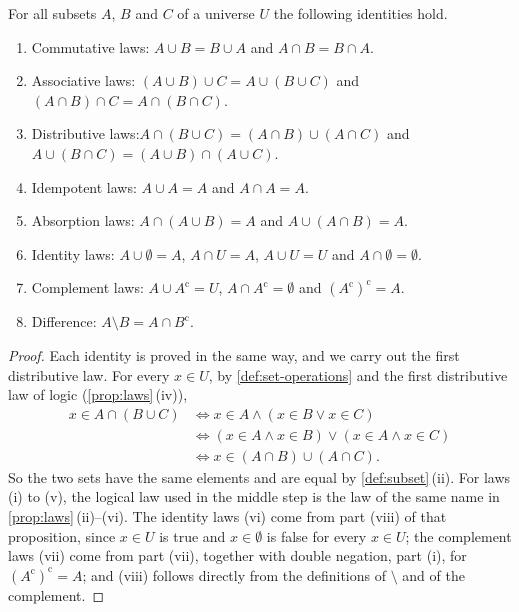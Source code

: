 \begin{theorem}
\label{thm:set-algebra}
For all subsets $A$, $B$ and $C$ of a universe $U$ the following identities hold.
\begin{enumerate}
\item Commutative laws: $A\cup B=B\cup A$ and $A\cap B=B\cap A$.
\item Associative laws: $(A\cup B)\cup C=A\cup(B\cup C)$ and $(A\cap B)\cap C=A\cap(B\cap C)$.
\item Distributive laws:\newline $A\cap(B\cup C)=(A\cap B)\cup(A\cap C)$ and $A\cup(B\cap C)=(A\cup B)\cap(A\cup C)$.
\item Idempotent laws: $A\cup A=A$ and $A\cap A=A$.
\item Absorption laws: $A\cap(A\cup B)=A$ and $A\cup(A\cap B)=A$.
\item Identity laws: $A\cup\emptyset=A$, $A\cap U=A$, $A\cup U=U$ and $A\cap\emptyset=\emptyset$.
\item Complement laws: $A\cup A^{\mathrm c}=U$, $A\cap A^{\mathrm c}=\emptyset$ and $(A^{\mathrm c})^{\mathrm c}=A$.
\item Difference: $A\setminus B=A\cap B^{\mathrm c}$.
\end{enumerate}
\end{theorem}

\begin{proof}
Each identity is proved in the same way, and we carry out the first distributive law. For every $x\in U$, by \cref{def:set-operations} and the first distributive law of logic (\cref{prop:laws}\,(iv)),
\begin{align*}
x\in A\cap(B\cup C)
&\iff x\in A\wedge(x\in B\vee x\in C)\\
&\iff(x\in A\wedge x\in B)\vee(x\in A\wedge x\in C)\\
&\iff x\in(A\cap B)\cup(A\cap C).
\end{align*}
So the two sets have the same elements and are equal by \cref{def:subset}\,(ii). For laws (i) to (v), the logical law used in the middle step is the law of the same name in \cref{prop:laws}\,(ii)--(vi). The identity laws (vi) come from part (viii) of that proposition, since $x\in U$ is true and $x\in\emptyset$ is false for every $x\in U$; the complement laws (vii) come from part (vii), together with double negation, part (i), for $(A^{\mathrm c})^{\mathrm c}=A$; and (viii) follows directly from the definitions of $\setminus$ and of the complement.
\end{proof}

